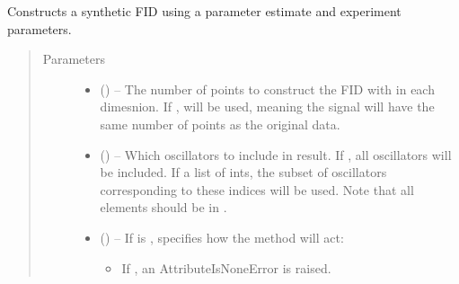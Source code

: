 \documentclass[letterpaper,10pt,english]{sphinxmanual}
\begin{document}
\begin{fulllineitems}
\begin{fulllineitems}
\label{\detokenize{references/core:nmrespy.core.Estimator.make_fid}}
\sphinxAtStartPar
Constructs a synthetic FID using a parameter estimate and
experiment parameters.
\begin{quote}\begin{description}
\item[{Parameters}] \leavevmode\begin{itemize}
\item {} 
\sphinxAtStartPar
{} (\sphinxstyleliteralemphasis{\sphinxupquote{{[}}}\sphinxstyleliteralemphasis{\sphinxupquote{{]}}}\sphinxstyleliteralemphasis{\sphinxupquote{{[}}}\sphinxstyleliteralemphasis{\sphinxupquote{, }}\sphinxstyleliteralemphasis{\sphinxupquote{{]}}}) – The number of points to construct the FID with in each dimesnion.
If , {\hyperref[\detokenize{references/core:nmrespy.core.Estimator.get_n}]{}} will be used, meaning the signal will
have the same number of points as the original data.

\item {} 
\sphinxAtStartPar
{} (\sphinxstyleliteralemphasis{\sphinxupquote{, }}) – Which oscillators to include in result. If , all
oscillators will be included. If a list of ints, the subset of
oscillators corresponding to these indices will be used. Note
that all elements should be in .

\item {} 
\sphinxAtStartPar
{} (\sphinxstyleliteralemphasis{\sphinxupquote{, }}) – 
\sphinxAtStartPar
If  is ,  specifies how the method will
act:
\begin{itemize}
\item {} 
\sphinxAtStartPar
If , an AttributeIsNoneError is raised.


\end{itemize}
\end{itemize}
\end{description}
\end{quote}
\end{fulllineitems}
\end{fulllineitems}
\end{document}
